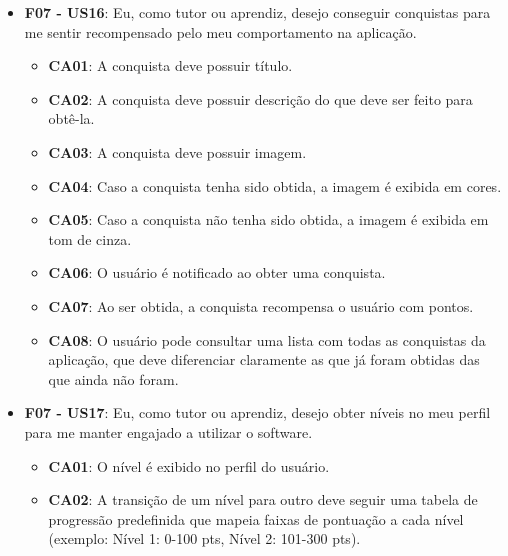\begin{itemize}
\begin{itemize}
\end{itemize}


\item \textbf{F07 - US16}: Eu, como tutor ou aprendiz, desejo conseguir conquistas para me sentir recompensado pelo meu comportamento na aplicação.

\begin{itemize}

\item \textbf{CA01}: A conquista deve possuir título.

\item \textbf{CA02}: A conquista deve possuir descrição do que deve ser feito para obtê-la.

\item \textbf{CA03}: A conquista deve possuir imagem.

\item \textbf{CA04}: Caso a conquista tenha sido obtida, a imagem é exibida em cores.

\item \textbf{CA05}: Caso a conquista não tenha sido obtida, a imagem é exibida em tom de cinza.

\item \textbf{CA06}: O usuário é notificado ao obter uma conquista.

\item \textbf{CA07}: Ao ser obtida, a conquista recompensa o usuário com pontos.

\item \textbf{CA08}: O usuário pode consultar uma lista com todas as conquistas da aplicação, que deve diferenciar claramente as que já foram obtidas das que ainda não foram.

\end{itemize}

\item \textbf{F07 - US17}: Eu, como tutor ou aprendiz, desejo obter níveis no meu perfil para me manter engajado a utilizar o software.

\begin{itemize}

\item \textbf{CA01}: O nível é exibido no perfil do usuário.

\item \textbf{CA02}: A transição de um nível para outro deve seguir uma tabela de progressão predefinida que mapeia faixas de pontuação a cada nível (exemplo: Nível 1: 0-100 pts, Nível 2: 101-300 pts).


\end{itemize}
\end{itemize}
